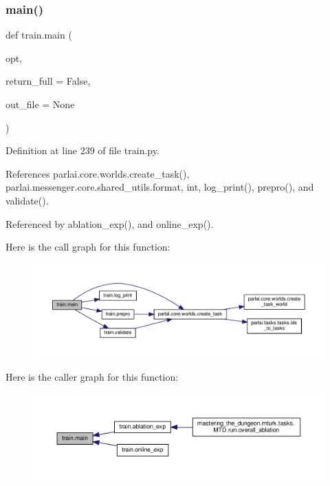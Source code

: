 \subsubsection{\texorpdfstring{main()}{main()}}
{\footnotesize\ttfamily def train.\+main (\begin{DoxyParamCaption}\item[{}]{opt,  }\item[{}]{return\+\_\+full = {\ttfamily False},  }\item[{}]{out\+\_\+file = {\ttfamily None} }\end{DoxyParamCaption})}



Definition at line 239 of file train.\+py.



References parlai.\+core.\+worlds.\+create\+\_\+task(), parlai.\+messenger.\+core.\+shared\+\_\+utils.\+format, int, log\+\_\+print(), prepro(), and validate().



Referenced by ablation\+\_\+exp(), and online\+\_\+exp().

Here is the call graph for this function\+:
\nopagebreak
\begin{figure}[H]
\begin{center}
\leavevmode
\includegraphics[width=350pt]{namespacetrain_a6e1c17af3a14f1cd1b54ee54ccf5a77b_cgraph}
\end{center}
\end{figure}
Here is the caller graph for this function\+:
\nopagebreak
\begin{figure}[H]
\begin{center}
\leavevmode
\includegraphics[width=350pt]{namespacetrain_a6e1c17af3a14f1cd1b54ee54ccf5a77b_icgraph}
\end{center}
\end{figure}
\mbox{\label{namespacetrain_ae2ba29fb97dfcb37d81039ba8e7d8580}} 
